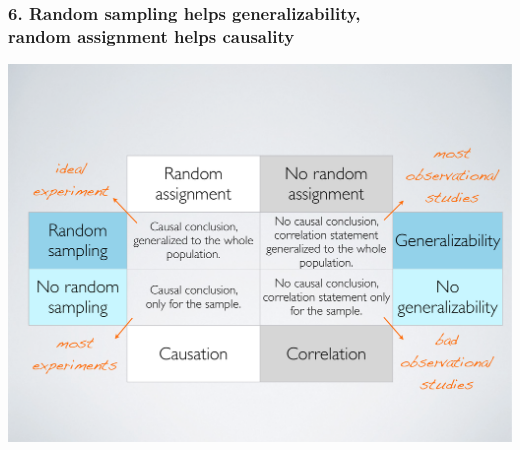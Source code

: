 \documentclass[11pt,containsverbatim,handout,xcolor=xelatex,dvipsnames,table]{beamer}
\begin{document}
\begin{frame}
\frametitle{6. Random sampling helps generalizability,\\ random assignment helps causality}

\begin{center}
\includegraphics[width=\textwidth]{figures/random_sample_assignment}
\end{center}

\end{frame}

\end{document}
